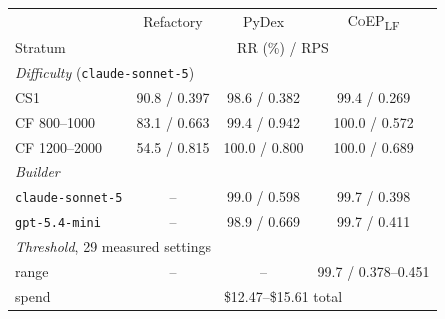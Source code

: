 \begin{tabular}{@{}l@{\hskip 4pt}ccc@{}}
\toprule
& Refactory & PyDex & \textsc{CoEP}\textsubscript{LF} \\
Stratum & \multicolumn{3}{c}{RR (\%) / RPS} \\
\midrule
\multicolumn{4}{l}{\emph{Difficulty} (\texttt{claude-sonnet-5})}\\
\quad CS1 & 90.8 / 0.397 & 98.6 / 0.382 & 99.4 / 0.269 \\
\quad CF 800--1000 & 83.1 / 0.663 & 99.4 / 0.942 & 100.0 / 0.572 \\
\quad CF 1200--2000 & 54.5 / 0.815 & 100.0 / 0.800 & 100.0 / 0.689 \\
\midrule
\multicolumn{4}{l}{\emph{Builder}}\\
\quad \texttt{claude-sonnet-5} & -- & 99.0 / 0.598 & 99.7 / 0.398 \\
\quad \texttt{gpt-5.4-mini} & -- & 98.9 / 0.669 & 99.7 / 0.411 \\
\midrule
\multicolumn{4}{l}{\emph{Threshold}, 29 measured settings}\\
\quad range & -- & -- & 99.7 / 0.378--0.451 \\
\quad spend & \multicolumn{3}{c}{\$12.47--\$15.61 total} \\
\bottomrule
\end{tabular}
